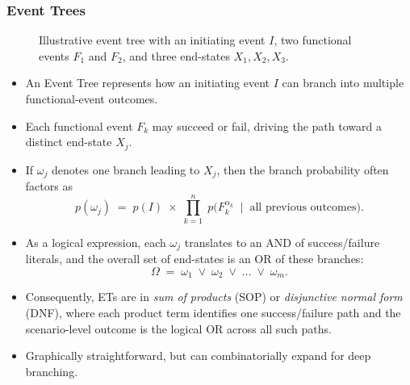 \begin{frame}[t, allowframebreaks]
\frametitle{Event Trees}
\begin{figure}[ht!]
\centering
{}
\caption{Illustrative event tree with an initiating event \(I\), two functional events \(F_1\) and \(F_2\), and three end-states \(X_1, X_2, X_3\).}
\label{fig:event_tree_example}
\end{figure}
\begin{itemize}
  \item An Event Tree represents how an initiating event \(I\) can branch into multiple functional-event outcomes.
  \item Each functional event \(F_k\) may succeed or fail, driving the path toward a distinct end-state \(X_j\).  
  \item If \(\omega_j\) denotes one branch leading to \(X_j\), then the branch probability often factors as 
    \[
      p(\omega_j) \;=\; p(I)\;\times\;\prod_{k=1}^{n} \; p\bigl(F_k^{\alpha_k} \;\mid\; \text{all previous outcomes}\bigr).
    \]
  \item As a logical expression, each \(\omega_j\) translates to an AND of success/failure literals, and the overall set of end-states is an OR of these branches:
    \[
      \Omega \;=\;\omega_1 \;\lor\;\omega_2 \;\lor\;\dots\;\lor\;\omega_m.
    \]
  \item Consequently, ETs are in \emph{sum of products} (SOP) or \emph{disjunctive normal form} (DNF), where each product term identifies one success/failure path and the scenario-level outcome is the logical OR across all such paths.
  \vspace{4pt}
  \item Graphically straightforward, but can combinatorially expand for deep branching.
\end{itemize}
\end{frame}

